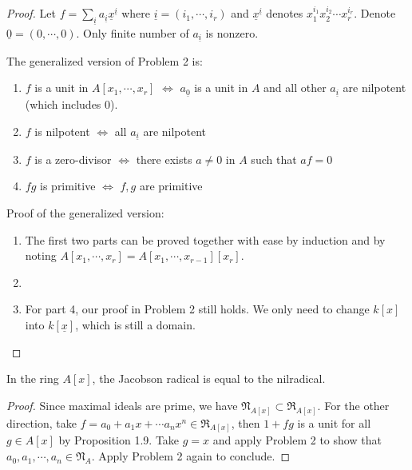 \documentclass{solution}
\begin{document}
\begin{proof}
    Let $f = \sum\limits_{\underline{i}} a_{\underline{i}}\underline{x}^{\underline{i}}$ where $\underline{i} = (i_1, \cdots, i_r)$ and $\underline{x}^{\underline{i}}$ denotes $x_1^{i_1}x_2^{i_2} \cdots x_r^{i_r}$. Denote $\underline{0} = (0, \cdots, 0)$. Only finite number of $a_{\underline{i}}$ is nonzero.

    The generalized version of Problem 2 is:

    \begin{enumerate}
        \item $f$ is a unit in $A[x_1, \cdots, x_r]$ $\Leftrightarrow$ $a_{\underline{0}}$ is a unit in $A$ and all other $a_{\underline{i}}$ are nilpotent (which includes $0$).
        \item $f$ is nilpotent $\Leftrightarrow$ all $a_{\underline{i}}$ are nilpotent
        \item $f$ is a zero-divisor $\Leftrightarrow$ there exists $a \ne 0$ in $A$ such that $af = 0$
        \item $fg$ is primitive $\Leftrightarrow$ $f,g$ are primitive
    \end{enumerate}

    Proof of the generalized version:

    \begin{enumerate}
        \item The first two parts can be proved together with ease by induction and by noting $A[x_1, \cdots, x_r] = A[x_1, \cdots, x_{r - 1}][x_r]$.
        \item \TODO
        \item For part 4, our proof in Problem 2 still holds. We only need to change $k[x]$ into $k[\underline{x}]$, which is still a domain.
    \end{enumerate}
\end{proof}

\begin{problem}{4}
    In the ring $A[x]$, the Jacobson radical is equal to the nilradical.
\end{problem}

\begin{proof}
    Since maximal ideals are prime, we have $\mathfrak{N}_{A[x]} \subset \mathfrak{R}_{A[x]}$. For the other direction, take $f = a_0 + a_1 x + \cdots a_n x^n \in \mathfrak{R}_{A[x]}$, then $1 + fg$ is a unit for all $g \in A[x]$ by Proposition 1.9. Take $g = x$ and apply Problem 2 to show that $a_0, a_1, \cdots, a_n \in \mathfrak{N}_A$. Apply Problem 2 again to conclude.
\end{proof}
\end{document}
